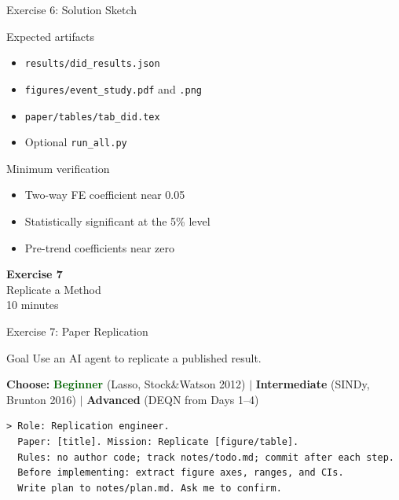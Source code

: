 \documentclass[aspectratio=169,10pt]{beamer}
\begin{document}
\begin{frame}{Exercise 6: Solution Sketch}
\small
\begin{exampleblock}{Expected artifacts}
\begin{itemize}\itemsep1pt
    \item \texttt{results/did\_results.json}
    \item \texttt{figures/event\_study.pdf} and \texttt{.png}
    \item \texttt{paper/tables/tab\_did.tex}
    \item Optional \texttt{run\_all.py}
\end{itemize}
\end{exampleblock}

\begin{alertblock}{Minimum verification}
\begin{itemize}\itemsep1pt
    \item Two-way FE coefficient near 0.05
    \item Statistically significant at the 5\% level
    \item Pre-trend coefficients near zero
\end{itemize}
\end{alertblock}
\end{frame}

\begin{frame}{}
\vfill\begin{center}{\Huge \textcolor{uzhblue}{\textbf{Exercise 7}}}\\[12pt]
{\LARGE Replicate a Method}\\[6pt]{\small 10 minutes}\end{center}\vfill
\end{frame}

\begin{frame}[fragile]{Exercise 7: Paper Replication}
\begin{exampleblock}{Goal}
Use an AI agent to replicate a published result.
\end{exampleblock}
\small
\textbf{Choose:} \textcolor{darkgreen}{\textbf{Beginner}} (Lasso, Stock\&Watson 2012) $|$
\textcolor{softorange}{\textbf{Intermediate}} (SINDy, Brunton 2016) $|$
\textcolor{harvardcrimson}{\textbf{Advanced}} (DEQN from Days 1--4)

\vspace{0.3em}
\begin{lstlisting}[style=prompt, basicstyle=\scriptsize\ttfamily]
> Role: Replication engineer.
  Paper: [title]. Mission: Replicate [figure/table].
  Rules: no author code; track notes/todo.md; commit after each step.
  Before implementing: extract figure axes, ranges, and CIs.
  Write plan to notes/plan.md. Ask me to confirm.
\end{lstlisting}
\end{frame}
\end{document}

